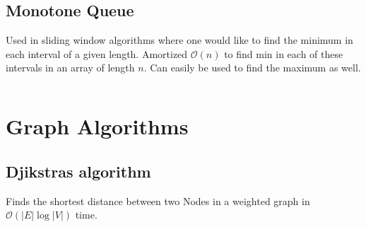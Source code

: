 \documentclass[8pt,a4paper,landscape,oneside]{amsart}
\newcommand{\code}[1]{\inputminted[fontsize=\normalsize,baselinestretch=1]{cpp}{code/#1}}
\newcommand{\bigO}{\mathcal{O}}
\begin{document}
\begin{multicols*}{3}
    \subsection{Monotone Queue}
        Used in sliding window algorithms where one would like to find the minimum in each interval of a given length. Amortized $\bigO(n)$ to find min in each of these intervals in an array of length $n$. Can easily be used to find the maximum as well.
        \code{DS/MinMonQue.java}
\section{Graph Algorithms}
    \subsection{Djikstras algorithm}
        Finds the shortest distance between two Nodes in a weighted graph in $\bigO (|E| \log{|V|})$ time.
        \code{Graphs/Djikstra.java}
\end{multicols*}
\end{document}
